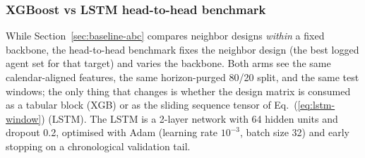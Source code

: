 \documentclass[12pt,a4paper,titlepage]{article}
\begin{document}
\begin{table}[htbp]
\centering
\small
\caption{Representative Baseline A vs B vs Proposed comparison at \(H=10\) under the boosted-tree backbone. Lower MAE is better. ``Beats 0'' indicates whether each arm outperforms the zero-return baseline on its own (post-feature) test slice; the zero baseline is evaluated on that arm's final test rows after feature construction, which can differ slightly across arms.}
\label{tab:baseline-abc}
\end{table}

\subsubsection{XGBoost vs LSTM head-to-head benchmark}
\label{sec:xgb-vs-lstm-h10}

While Section~\ref{sec:baseline-abc} compares neighbor designs \emph{within} a fixed backbone, the head-to-head benchmark fixes the neighbor design (the best logged agent set for that target) and varies the backbone. Both arms see the same calendar-aligned features, the same horizon-purged 80/20 split, and the same test windows; the only thing that changes is whether the design matrix is consumed as a tabular block (XGB) or as the sliding sequence tensor of Eq.~(\ref{eq:lstm-window}) (LSTM). The LSTM is a 2-layer network with 64 hidden units and dropout 0.2, optimised with Adam (learning rate \(10^{-3}\), batch size 32) and early stopping on a chronological validation tail.
\end{document}
